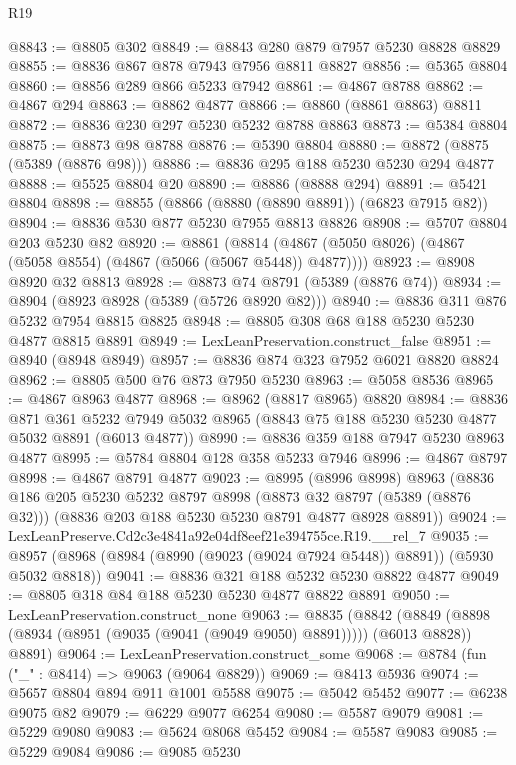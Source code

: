 \begin{lexlean}{R19}
\begin{coremodule}
@8843 := @8805 @302
@8849 := @8843 @280 @879 @7957 @5230 @8828 @8829
@8855 := @8836 @867 @878 @7943 @7956 @8811 @8827
@8856 := @5365 @8804
@8860 := @8856 @289 @866 @5233 @7942
@8861 := @4867 @8788
@8862 := @4867 @294
@8863 := @8862 @4877
@8866 := @8860 (@8861 @8863) @8811
@8872 := @8836 @230 @297 @5230 @5232 @8788 @8863
@8873 := @5384 @8804
@8875 := @8873 @98 @8788
@8876 := @5390 @8804
@8880 := @8872 (@8875 (@5389 (@8876 @98)))
@8886 := @8836 @295 @188 @5230 @5230 @294 @4877
@8888 := @5525 @8804 @20
@8890 := @8886 (@8888 @294)
@8891 := @5421 @8804
@8898 := @8855 (@8866 (@8880 (@8890 @8891)) (@6823 @7915 @82))
@8904 := @8836 @530 @877 @5230 @7955 @8813 @8826
@8908 := @5707 @8804 @203 @5230 @82
@8920 := @8861
    (@8814 (@4867 (@5050 @8026) (@4867 (@5058 @8554) (@4867 (@5066 (@5067 @5448)) @4877))))
@8923 := @8908 @8920 @32 @8813
@8928 := @8873 @74 @8791 (@5389 (@8876 @74))
@8934 := @8904 (@8923 @8928 (@5389 (@5726 @8920 @82)))
@8940 := @8836 @311 @876 @5232 @7954 @8815 @8825
@8948 := @8805 @308 @68 @188 @5230 @5230 @4877 @8815 @8891
@8949 := LexLeanPreservation.construct_false
@8951 := @8940 (@8948 @8949)
@8957 := @8836 @874 @323 @7952 @6021 @8820 @8824
@8962 := @8805 @500 @76 @873 @7950 @5230
@8963 := @5058 @8536
@8965 := @4867 @8963 @4877
@8968 := @8962 (@8817 @8965) @8820
@8984 := @8836
    @871
    @361
    @5232
    @7949
    @5032
    @8965
    (@8843 @75 @188 @5230 @5230 @4877 @5032 @8891 (@6013 @4877))
@8990 := @8836 @359 @188 @7947 @5230 @8963 @4877
@8995 := @5784 @8804 @128 @358 @5233 @7946
@8996 := @4867 @8797
@8998 := @4867 @8791 @4877
@9023 := @8995
    (@8996 @8998)
    @8963
    (@8836
      @186
      @205
      @5230
      @5232
      @8797
      @8998
      (@8873 @32 @8797 (@5389 (@8876 @32)))
      (@8836 @203 @188 @5230 @5230 @8791 @4877 @8928 @8891))
@9024 := LexLeanPreserve.Cd2c3e4841a92e04df8eef21e394755ce.R19.__rel_7
@9035 := @8957 (@8968 (@8984 (@8990 (@9023 (@9024 @7924 @5448)) @8891)) (@5930 @5032 @8818))
@9041 := @8836 @321 @188 @5232 @5230 @8822 @4877
@9049 := @8805 @318 @84 @188 @5230 @5230 @4877 @8822 @8891
@9050 := LexLeanPreservation.construct_none
@9063 := @8835
    (@8842 (@8849 (@8898 (@8934 (@8951 (@9035 (@9041 (@9049 @9050) @8891))))) (@6013 @8828)) @8891)
@9064 := LexLeanPreservation.construct_some
@9068 := @8784 (fun ("_" : @8414) => @9063 (@9064 @8829))
@9069 := @8413 @5936
@9074 := @5657 @8804 @894 @911 @1001 @5588
@9075 := @5042 @5452
@9077 := @6238 @9075 @82
@9079 := @6229 @9077 @6254
@9080 := @5587 @9079
@9081 := @5229 @9080
@9083 := @5624 @8068 @5452
@9084 := @5587 @9083
@9085 := @5229 @9084
@9086 := @9085 @5230

\end{coremodule}
\end{lexlean}
